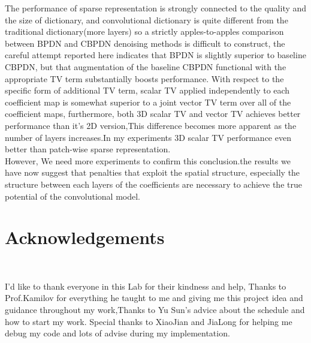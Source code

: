 \documentclass[a4paper,11pt]{article}
\begin{document}
The performance of sparse representation is strongly connected to the quality and the size of dictionary, and convolutional dictionary is quite different from the traditional dictionary(more layers) so a strictly apples-to-apples comparison between BPDN and CBPDN denoising methods is difficult to construct, the careful attempt reported here indicates that BPDN is slightly superior to baseline CBPDN, but that augmentation of the baseline CBPDN functional with the appropriate TV term substantially boosts performance. With respect to the specific form of additional TV term, scalar TV applied independently to each coefficient map is somewhat superior to a joint vector TV term over all of the coefficient maps, furthermore, both 3D scalar TV and vector TV achieves better performance than it's 2D version,This difference becomes more apparent as the number of layers increases.In my experiments 3D scalar TV performance even better than patch-wise sparse representation.\\

However, We need more experiments to confirm this conclusion.the results we have now suggest that penalties that exploit the spatial structure, especially the structure between each layers of the coefficients are necessary to achieve the true potential of the convolutional model.\cite{DBLP:journals/corr/Wohlberg17a}


 
\section{Acknowledgements}~


I'd like to thank everyone in this Lab for their kindness and help, Thanks to Prof.Kamilov for everything he taught to me and giving me this project idea and guidance throughout my work,Thanks to Yu Sun's advice about the schedule and how to start my work. Special thanks to XiaoJian and JiaLong for helping me debug my code and lots of advise during my implementation.
 

\newpage




  
\end{document}
